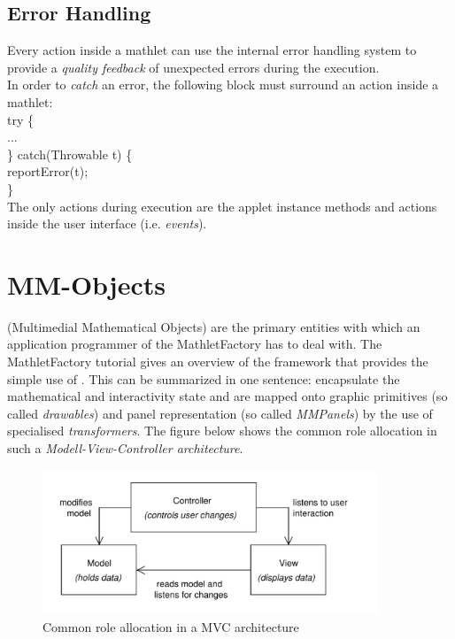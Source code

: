   \subsection{Error Handling}
  Every action inside a mathlet can use the internal error handling system to provide a 
  \textit{quality feedback} of unexpected errors during the execution.\\
  In order to \textit{catch} an error, the following block must surround an action inside a mathlet:\\
  {\small\ttfamily
    \indent try \{\\
    \indent\indent ...\\
    \indent \} catch(Throwable t) \{\\
    \indent\indent reportError(t);\\
    \indent \}\\
  }
  The only actions during execution are the applet instance methods and actions inside the user interface
  (i.e. \textit{events}).
  
\newpage
\section{MM-Objects}
  \mmos (Multimedial Mathematical Objects) are the primary entities with which 
  an application programmer of the MathletFactory has to deal with. The MathletFactory 
  tutorial gives an overview of the framework that provides the simple use of \mmos. 
  This can be summarized in one sentence: \mmos encapsulate the mathematical and 
  interactivity state and are mapped onto graphic primitives (so called {\it drawables}) 
  and panel representation (so called {\it MMPanels}) by the use of specialised 
  {\it transformers}. The figure below shows the common role allocation in such a 
  \textit{Modell-View-Controller architecture}.
	\begin{figure}[h]
	  \begin{center}
	    \includegraphics[width=10cm]
	      {images/mvc_common.pdf}
	    \caption{Common role allocation in a MVC architecture}
	    \label{fig:mvc_common}
	  \end{center}
	\end{figure}


